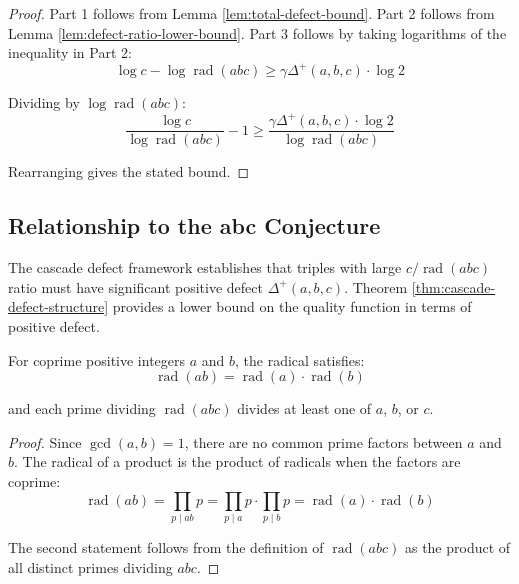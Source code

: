 \begin{proof}
Part 1 follows from Lemma \ref{lem:total-defect-bound}. Part 2 follows from Lemma \ref{lem:defect-ratio-lower-bound}. Part 3 follows by taking logarithms of the inequality in Part 2:
\begin{equation}
\log c - \log \operatorname{rad}(abc) \geq \gamma \Delta^{+}(a,b,c) \cdot \log 2
\end{equation}

Dividing by $\log \operatorname{rad}(abc)$:
\begin{equation}
\frac{\log c}{\log \operatorname{rad}(abc)} - 1 \geq \frac{\gamma \Delta^{+}(a,b,c) \cdot \log 2}{\log \operatorname{rad}(abc)}
\end{equation}

Rearranging gives the stated bound.

\end{proof}

\subsection{Relationship to the abc Conjecture}
\label{subsec:abc-relationship}

The cascade defect framework establishes that triples with large $c/\operatorname{rad}(abc)$ ratio must have significant positive defect $\Delta^{+}(a,b,c)$. Theorem \ref{thm:cascade-defect-structure} provides a lower bound on the quality function in terms of positive defect.

\begin{lemma}
\label{lem:radical-coprime-bound}

For coprime positive integers $a$ and $b$, the radical satisfies:
\begin{equation}
\operatorname{rad}(ab) = \operatorname{rad}(a) \cdot \operatorname{rad}(b)
\end{equation}

and each prime dividing $\operatorname{rad}(abc)$ divides at least one of $a$, $b$, or $c$.

\end{lemma}

\begin{proof}

Since $\gcd(a,b) = 1$, there are no common prime factors between $a$ and $b$. The radical of a product is the product of radicals when the factors are coprime:
\begin{equation}
\operatorname{rad}(ab) = \prod_{p \mid ab} p = \prod_{p \mid a} p \cdot \prod_{p \mid b} p = \operatorname{rad}(a) \cdot \operatorname{rad}(b)
\end{equation}

The second statement follows from the definition of $\operatorname{rad}(abc)$ as the product of all distinct primes dividing $abc$.

\end{proof}

